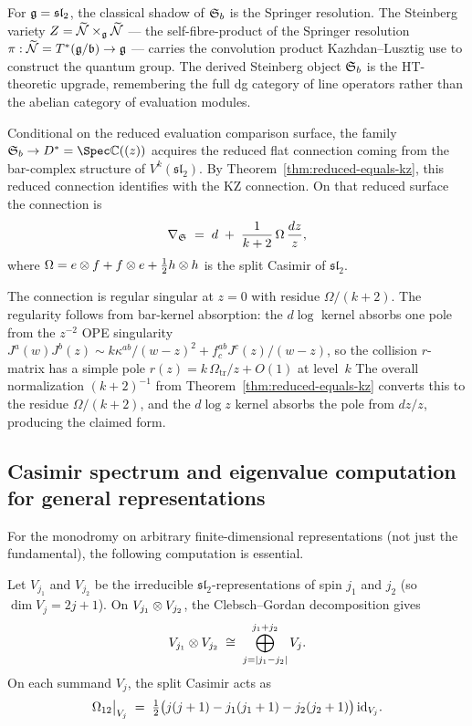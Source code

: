 For $\mathfrak{g} = \mathfrak{sl}_2$, the classical shadow of $\mathfrak{S}_b$ is the
Springer resolution. The Steinberg variety
$Z = \widetilde{\mathcal{N}} \times_{\mathfrak{g}} \widetilde{\mathcal{N}}$ — the
self-fibre-product of the Springer resolution
$\pi: \widetilde{\mathcal{N}} = T^*(\mathfrak{g}/\mathfrak{b}) \to \mathfrak{g}$ — carries the
convolution product Kazhdan--Lusztig use to construct the quantum
group. The derived Steinberg object $\mathfrak{S}_b$ is the HT-theoretic
upgrade, remembering the full dg category of line operators rather
than the abelian category of evaluation modules.

\begin{construction}
\label{constr:steinberg-sl2}
Conditional on the reduced evaluation comparison surface, the family
$\fS_b \to D^* = \Spec \CC((z))$ acquires the reduced flat connection
coming from the bar-complex structure of $V^k(\mathfrak{sl}_2)$. By
Theorem~\ref{thm:reduced-equals-kz}, this reduced connection identifies
with the KZ connection. On that reduced surface the connection is
\[
 \nabla_{\mathfrak{S}} \;=\; d \;+\; \frac{1}{k+2}\,\Omega\,\frac{dz}{z},
\]
where $\Omega = e \otimes f + f \otimes e + \tfrac{1}{2} h \otimes h$ is the split Casimir of $\mathfrak{sl}_2$.

The connection is regular singular at $z = 0$ with residue $\Omega/(k+2)$. The regularity follows from bar-kernel absorption: the $d\log$ kernel absorbs one pole from the $z^{-2}$ OPE singularity $J^a(w)J^b(z) \sim k\kappa^{ab}/(w-z)^2 + f^{ab}_c J^c(z)/(w-z)$, so the collision $r$-matrix has a simple pole $r(z) = k\,\Omega_{\mathrm{tr}}/z + O(1)$ at level~$k$ The overall normalization $(k+2)^{-1}$ from Theorem~\ref{thm:reduced-equals-kz} converts this to the residue $\Omega/(k+2)$, and the $d\log z$ kernel absorbs the pole from $dz/z$, producing the claimed form.
\end{construction}

\subsection{Casimir spectrum and eigenvalue computation for general representations}
\label{subsec:casimir-general}

For the monodromy on arbitrary finite-dimensional representations (not just the fundamental), the following computation is essential.

\begin{proposition}
\label{prop:casimir-general-sl2}
Let $V_{j_1}$ and $V_{j_2}$ be the irreducible $\mathfrak{sl}_2$-representations of spin $j_1$ and $j_2$ (so $\dim V_j = 2j+1$). On $V_{j_1} \otimes V_{j_2}$, the Clebsch--Gordan decomposition gives
\[
 V_{j_1} \otimes V_{j_2} \;\cong\; \bigoplus_{j = |j_1 - j_2|}^{j_1 + j_2} V_j.
\]
On each summand $V_j$, the split Casimir acts as
\[
 \Omega_{12}\big|_{V_j} \;=\; \tfrac{1}{2}\bigl(j(j+1) - j_1(j_1+1) - j_2(j_2+1)\bigr)\,\mathrm{id}_{V_j}.
\]
\end{proposition}

